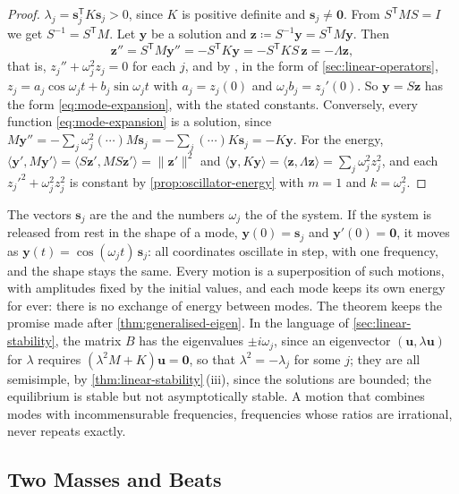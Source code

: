 \begin{proof}
$\lambda_j=\mathbf s_j^{\mathsf T}K\mathbf s_j>0$, since $K$ is positive definite and $\mathbf s_j\ne\mathbf 0$. From $S^{\mathsf T}MS=I$ we get $S^{-1}=S^{\mathsf T}M$. Let $\mathbf y$ be a solution and $\mathbf z\coloneqq S^{-1}\mathbf y=S^{\mathsf T}M\mathbf y$. Then
\[
\mathbf z''=S^{\mathsf T}M\mathbf y''=-S^{\mathsf T}K\mathbf y=-S^{\mathsf T}KS\,\mathbf z=-\Lambda\mathbf z ,
\]
that is, $z_j''+\omega_j^2z_j=0$ for each $j$, and by , in the form of \cref{sec:linear-operators}, $z_j=a_j\cos\omega_jt+b_j\sin\omega_jt$ with $a_j=z_j(0)$ and $\omega_jb_j=z_j'(0)$. So $\mathbf y=S\mathbf z$ has the form \eqref{eq:mode-expansion}, with the stated constants. Conversely, every function \eqref{eq:mode-expansion} is a solution, since $M\mathbf y''=-\sum_j\omega_j^2(\cdots)M\mathbf s_j=-\sum_j(\cdots)K\mathbf s_j=-K\mathbf y$. For the energy, $\langle\mathbf y',M\mathbf y'\rangle=\langle S\mathbf z',MS\mathbf z'\rangle=\|\mathbf z'\|^2$ and $\langle\mathbf y,K\mathbf y\rangle=\langle\mathbf z,\Lambda\mathbf z\rangle=\sum_j\omega_j^2z_j^2$, and each $z_j'^2+\omega_j^2z_j^2$ is constant by \cref{prop:oscillator-energy} with $m=1$ and $k=\omega_j^2$.
\end{proof}

The vectors $\mathbf s_j$ are the  and the numbers $\omega_j$ the  of the system. If the system is released from rest in the shape of a mode, $\mathbf y(0)=\mathbf s_j$ and $\mathbf y'(0)=\mathbf 0$, it moves as $\mathbf y(t)=\cos(\omega_jt)\,\mathbf s_j$: all coordinates oscillate in step, with one frequency, and the shape stays the same. Every motion is a superposition of such motions, with amplitudes fixed by the initial values, and each mode keeps its own energy for ever: there is no exchange of energy between modes. The theorem keeps the promise made after \cref{thm:generalised-eigen}. In the language of \cref{sec:linear-stability}, the matrix $B$ has the eigenvalues $\pm i\omega_j$, since an eigenvector $(\mathbf u,\lambda\mathbf u)$ for $\lambda$ requires $(\lambda^2M+K)\mathbf u=\mathbf 0$, so that $\lambda^2=-\lambda_j$ for some $j$; they are all semisimple, by \cref{thm:linear-stability}\,(iii), since the solutions are bounded; the equilibrium is stable but not asymptotically stable. A motion that combines modes with incommensurable frequencies, frequencies whose ratios are irrational, never repeats exactly.

\subsection{Two Masses and Beats}

